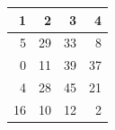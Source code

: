 \begin{tabular}{rrrr}
\toprule
1 & 2 & 3 & 4 \\
\midrule
5 & 29 & 33 & 8 \\
0 & 11 & 39 & 37 \\
4 & 28 & 45 & 21 \\
16 & 10 & 12 & 2 \\
\bottomrule
\end{tabular}
